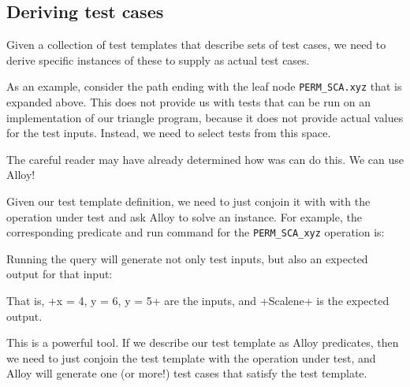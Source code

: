 \subsection{Deriving test cases}

Given a collection of test templates that describe sets of test cases, we need to derive specific instances of these to supply as actual test cases.

As an example, consider the path ending with the leaf node \texttt{PERM\_SCA.xyz} that is expanded above. This does not provide us with tests that can be run on an implementation of our triangle program, because it does not provide actual values for the test inputs. Instead, we need to select tests from this space.

The careful reader may have already determined how was can do this. We can use Alloy!

Given our test template definition, we need to just conjoin it with  with the operation under test and ask Alloy to solve an instance. For example, the corresponding predicate and run command for the \texttt{PERM\_SCA\_xyz} operation is:

\lstset{aboveskip=3mm}

Running the query will generate not only test inputs, but also an expected output for that input:


That is, \A+x = 4, y = 6, y = 5+ are the inputs, and \A+Scalene+ is the expected output.

This is a powerful tool. If we describe our test template as Alloy predicates, then we need to just conjoin the test template with the operation under test, and Alloy will generate one (or more!) test cases that satisfy the test template.


